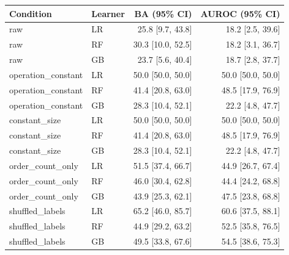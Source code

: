 \begin{tabular}{llrr}\toprule
Condition & Learner & BA (95\% CI) & AUROC (95\% CI)\\\midrule
raw & LR & 25.8 [9.7, 43.8] & 18.2 [2.5, 39.6]\\
raw & RF & 30.3 [10.0, 52.5] & 18.2 [3.1, 36.7]\\
raw & GB & 23.7 [5.6, 40.4] & 18.7 [2.8, 37.7]\\
operation\_constant & LR & 50.0 [50.0, 50.0] & 50.0 [50.0, 50.0]\\
operation\_constant & RF & 41.4 [20.8, 63.0] & 48.5 [17.9, 76.9]\\
operation\_constant & GB & 28.3 [10.4, 52.1] & 22.2 [4.8, 47.7]\\
constant\_size & LR & 50.0 [50.0, 50.0] & 50.0 [50.0, 50.0]\\
constant\_size & RF & 41.4 [20.8, 63.0] & 48.5 [17.9, 76.9]\\
constant\_size & GB & 28.3 [10.4, 52.1] & 22.2 [4.8, 47.7]\\
order\_count\_only & LR & 51.5 [37.4, 66.7] & 44.9 [26.7, 67.4]\\
order\_count\_only & RF & 46.0 [30.4, 62.8] & 44.4 [24.2, 68.8]\\
order\_count\_only & GB & 43.9 [25.3, 62.1] & 47.5 [23.8, 68.8]\\
shuffled\_labels & LR & 65.2 [46.0, 85.7] & 60.6 [37.5, 88.1]\\
shuffled\_labels & RF & 44.9 [29.2, 63.2] & 52.5 [35.8, 76.5]\\
shuffled\_labels & GB & 49.5 [33.8, 67.6] & 54.5 [38.6, 75.3]\\
\bottomrule\end{tabular}
